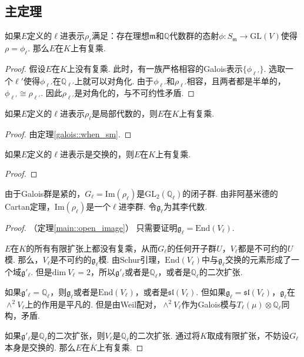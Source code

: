 \subsection{主定理}

\begin{cthm}
    如果$E$定义的$\ell$进表示$\rho_{\ell}$满足：存在理想$\mathfrak{m}$和$\mathbb{Q}$代数群的态射$\phi: S_{\mathfrak{m}}\to \mathrm{GL}(V)$使得$\rho = \phi_{\ell}$. 那么$E$在$K$上有复乘.
\end{cthm}

\begin{proof}
    假设$E$在$K$上没有复乘. 此时，有一族严格相容的Galois表示$\{\phi_{\ell'}\}$. 选取一个$\ell'$使得$\phi_{\ell'}$在$\mathbb{Q}_{\ell'}$上就可以对角化. 由于$\phi_{\ell'}$和$\rho_{\ell'}$相容，且两者都是半单的，$\phi_{\ell'}\cong \rho_{\ell'}$. 因此$\rho_{\ell'}$是对角化的，与不可约性矛盾.
\end{proof}

\begin{ccor}
    如果$E$定义的$\ell$进表示$\rho_{\ell}$是局部代数的，则$E$在$K$上有复乘. \label{reps::when_cm}
\end{ccor}

\begin{proof}
    由定理\ref{galois::when_sm}. 
\end{proof}

\begin{ccor}
    如果$E$定义的$\ell$进表示是交换的，则$E$在$K$上有复乘.
\end{ccor}

\begin{proof}
\end{proof}

由于Galois群是紧的，$G_{\ell} = \mathrm{Im}(\rho_\ell)$是$\mathrm{GL}_2(\mathbb{Q}_{\ell})$的闭子群. 由非阿基米德的Cartan定理，$\mathrm{Im}(\rho_{\ell})$是一个$\ell$进李群. 令$\mathfrak{g}_{\ell}$为其李代数.

\begin{proof}
    （定理\ref{main::open_image}）
    只需要证明$\mathfrak{g}_{\ell} = \mathrm{End}(V_{\ell})$.

    $E$在$K$的所有有限扩张上都没有复乘，从而$G_{\ell}$的任何开子群$U$，$V_{\ell}$都是不可约的$U$模. 那么，$V_{\ell}$是不可约的$\mathfrak{g}_{\ell}$模. 由Schur引理，$\mathrm{End}(V_{\ell})$中与$\mathfrak{g}_{\ell}$交换的元素形成了一个域$\mathfrak{g}'_{\ell}$. 但是$\mathrm{dim}\ V_{\ell}=2$，所以$\mathfrak{g}'_{\ell}$或者是$\mathbb{Q}_{\ell}$，或者是$\mathbb{Q}_{\ell}$的二次扩张.

    如果$\mathfrak{g}'_{\ell} = \mathbb{Q}_{\ell}$，则$\mathfrak{g}_{\ell}$或者是$\mathrm{End}(V_{\ell})$，或者是$\mathfrak{sl}(V_{\ell})$. 但如果$\mathfrak{g}_{\ell} = \mathfrak{sl}(V_{\ell})$，$\mathfrak{g}_{\ell}$在$\wedge^2 V_{\ell}$上的作用是平凡的. 但是由Weil配对，$\wedge^2 V_{\ell}$作为Galois模与$T_{\ell}(\mu)\otimes \mathbb{Q}_{\ell}$同构，矛盾.

    如果$\mathfrak{g}'_{\ell}$是$\mathbb{Q}_{\ell}$的二次扩张，则$V_{\ell}$是$\mathbb{Q}_{\ell}$的二次扩张. 通过将$K$取成有限扩张，不妨设$G_{\ell}$本身是交换的.
    那么$E$在$\overline{K}$上有复乘.

\end{proof}

